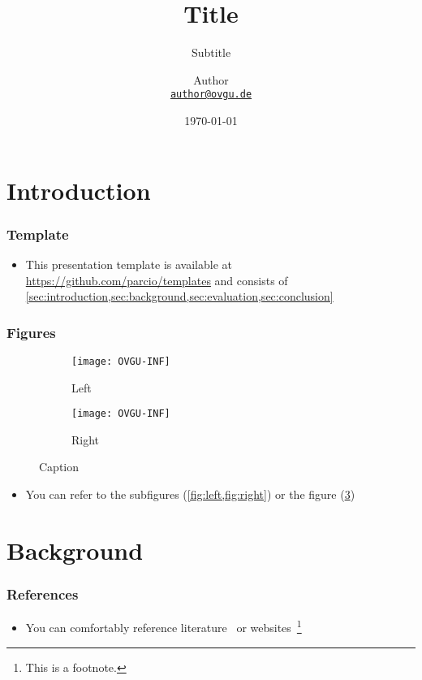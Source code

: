 \documentclass[
	aspectratio=169,
	compress,
]{beamer}
\title{Title}
\subtitle{Subtitle}
\author[Author]{
Author\\
{\footnotesize\href{mailto:author@ovgu.de}{\nolinkurl{author@ovgu.de}}}
}
\date{\today}
\institute{
Faculty of Computer Science\\
Otto von Guericke University Magdeburg
}
\newcommand{\navframetitle}[1]{\frametitle{#1\hfill{\footnotesize\lastsection{}}}}
\begin{document}
\maketitle

\section{Introduction}
\label{sec:introduction}

\begin{frame}
	\navframetitle{Template}

	\begin{itemize}
		\item This presentation template is available at \url{https://github.com/parcio/templates} and consists of \cref{sec:introduction,sec:background,sec:evaluation,sec:conclusion}
	\end{itemize}
\end{frame}

\begin{frame}
	\navframetitle{Figures}

	\begin{figure}[ht]
		\centering
		\begin{subfigure}{0.45\textwidth}
			\centering
			\texttt{[image: OVGU-INF]}
			\caption{Left}
			\label{fig:left}
		\end{subfigure}
		\begin{subfigure}{0.45\textwidth}
			\centering
			\texttt{[image: OVGU-INF]}
			\caption{Right}
			\label{fig:right}
		\end{subfigure}
		\caption{Caption}
		\label{fig:both}
	\end{figure}

	\begin{itemize}
		\item You can refer to the subfigures (\cref{fig:left,fig:right}) or the figure (\cref{fig:both})
	\end{itemize}
\end{frame}

\section{Background}
\label{sec:background}

\begin{frame}
	\navframetitle{References}

	\begin{itemize}
		\item You can comfortably reference literature~\cite{DBLP:journals/superfri/DuweLMSF0B020} or websites~\cite{WWW:ParCIO-Blog}\footnote{This is a footnote.}
	\end{itemize}
\end{frame}
\end{document}
